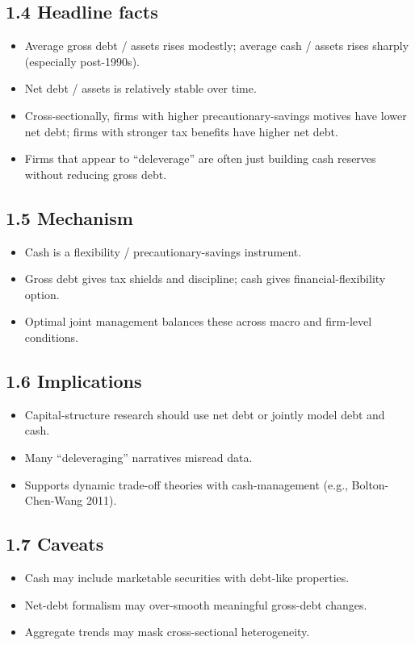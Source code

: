 \documentclass[11pt]{article}
\begin{document}
\subsection*{1.4 Headline facts}
\begin{itemize}
\item Average gross debt / assets rises modestly; average cash / assets rises sharply (especially post-1990s).
\item Net debt / assets is relatively stable over time.
\item Cross-sectionally, firms with higher precautionary-savings motives have lower net debt; firms with stronger tax benefits have higher net debt.
\item Firms that appear to ``deleverage'' are often just building cash reserves without reducing gross debt.
\end{itemize}

\subsection*{1.5 Mechanism}
\begin{itemize}
\item Cash is a flexibility / precautionary-savings instrument.
\item Gross debt gives tax shields and discipline; cash gives financial-flexibility option.
\item Optimal joint management balances these across macro and firm-level conditions.
\end{itemize}

\subsection*{1.6 Implications}
\begin{itemize}
\item Capital-structure research should use net debt or jointly model debt and cash.
\item Many ``deleveraging'' narratives misread data.
\item Supports dynamic trade-off theories with cash-management (e.g., Bolton-Chen-Wang 2011).
\end{itemize}

\subsection*{1.7 Caveats}
\begin{alertbox}
\begin{itemize}
\item Cash may include marketable securities with debt-like properties.
\item Net-debt formalism may over-smooth meaningful gross-debt changes.
\item Aggregate trends may mask cross-sectional heterogeneity.
\end{itemize}
\end{alertbox}
\end{document}
